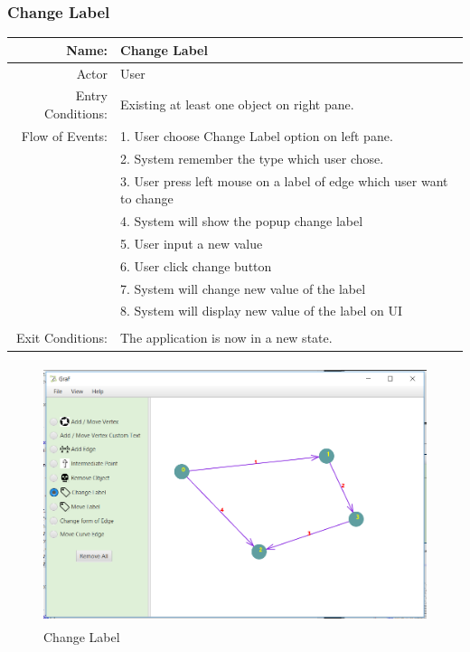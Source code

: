 \documentclass[a4paper,10pt]{article}
\begin{document}
\subsubsection{Change Label}
	\begin{tabular}{|r|l|}
\hline
Name: & Change Label\\
\hline
Actor & User \\
\hline
Entry Conditions: & Existing at least one object on right pane. \\
\hline
Flow of Events: & 1. User choose Change Label option on left pane. \\
& 2. System remember the type which user chose.  \\
& 3. User press left mouse on a label of edge which user want to change \\
& 4. System will show the popup change label \\
& 5. User input a new value \\
& 6. User click change button \\
& 7. System will change new value of the label \\
& 8. System will display new value of the label on UI \\
\\
\hline
Exit Conditions: & The application is now in a new state. \\
\hline

\end{tabular}
\begin{figure}[H]
		\centering
		\includegraphics[height = 3in]{changeLabelFunction.png}
		\caption[Optional caption]{Change Label}
		\label{fig:Repository}
	\end{figure}
\end{document}
